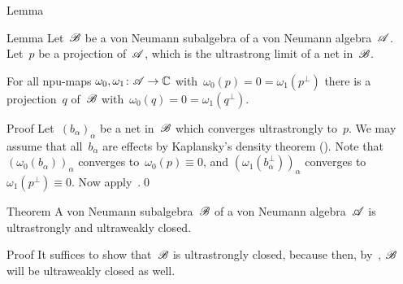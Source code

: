 \documentclass[a]{subfiles}
\begin{document}
\begin{parsec}
\begin{point}{Lemma}
\end{point}
\begin{point}{Lemma}%
Let~$\mathscr{B}$ be a von Neumann subalgebra
of a von Neumann algebra~$\mathscr{A}$.
Let~$p$ be a projection of~$\mathscr{A}$,
which is the ultrastrong limit of a net in~$\mathscr{B}$.

For all npu-maps $\omega_0,\omega_1\colon \mathscr{A}\to\mathbb{C}$
with~$\omega_0(p)=0= \omega_1(p^\perp)$
there is a projection~$q$ of~$\mathscr{B}$
with~$\omega_0(q)=0=\omega_1(q^\perp)$.
\begin{point}{Proof}%
Let~$(b_\alpha)_\alpha$ be a net in~$\mathscr{B}$
which converges ultrastrongly to~$p$.
We may assume that all~$b_\alpha$
are effects
by Kaplansky's density theorem ().
Note that~$(\omega_0(b_\alpha))_\alpha$ converges to~$\omega_0(p)\equiv 0$,
and $(\omega_1(b^\perp_\alpha))_\alpha$ converges 
to~$\omega_1(p^\perp)\equiv 0$.
Now apply~.\qed
\end{point}
\end{point}
\begin{point}[vnsac]{Theorem}%
A von Neumann subalgebra~$\mathscr{B}$ of a von Neumann algebra~$\mathscr{A}$
is ultrastrongly and ultraweakly closed.
\begin{point}{Proof}%
It suffices to show that~$\mathscr{B}$ is ultrastrongly closed,
because then, by~, $\mathscr{B}$ will be ultraweakly closed
as well.


\end{point}
\end{point}
\end{parsec}
\end{document}
